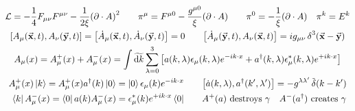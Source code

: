 \begin{gather*}
        \Lc = -\frac{1}{4}F_{\mu\nu}F^{\mu\nu} - \frac{1}{2\xi}\qty(\partial\cdot A)^2
        \qquad
        \pi^\mu = F^{\mu0} - \frac{g^{\mu0}}{\xi}\qty(\partial\cdot A)
        \qquad
        \pi^0 = -\frac{1}{\xi}\qty(\partial\cdot A)
        \quad
        \pi^k = E^k
        \\
        \comm{A_\mu(\va{x},t)}{A_\nu(\va{y},t)}
        = \comm{\dot{A}_\mu(\va{x},t)}{\dot{A}_\nu(\va{y},t)}
        = 0
        \qquad
        \comm{\dot{A}_\mu(\va{y},t)}{A_\nu(\va{x},t)}
        = ig_{\mu\nu}\Ddelta[3](\va{x}-\va{y})
        \\
        A_\mu(x)
        = A_\mu^+(x) + A_\mu^-(x)
        = \int\Tdd{k} \sum_{\lambda=0}^3\qty[a(k,\lambda)\epsilon_\mu(k,\lambda)e^{-ik\cdot x} + a^\dagger(k,\lambda)\epsilon^*_\mu(k,\lambda)e^{+ik\cdot x}]
        \\
        \begin{aligned}
                A_\mu^+(x)\ket{k} = A_\mu^+(x)a^\dagger(k)\ket{0} = \ket{0}\epsilon_\mu(k)e^{-ik\cdot x}
                &\qquad
                \comm{\dot{a}(k,\lambda)}{a^\dagger(k',\lambda')}
                = - g^{\lambda\lambda'}\Tdelta(k-k')
                \\
                \bra{k}A_\mu^-(x) = \bra{0}a(k)A_\mu^-(x) = \epsilon^*_\mu(k)e^{+ik\cdot x}\bra{0}
                &\qquad
                A^+(a) \text{ destroys } \ce{\gamma}
                \quad
                A^-(a^\dagger) \text{ creates } \ce{\gamma}
        \end{aligned}
\end{gather*}
